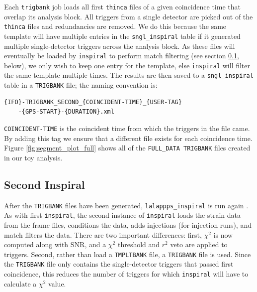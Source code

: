 Each \texttt{trigbank} job loads all first \texttt{thinca} files of a given
coincidence time that overlap its analysis block. All triggers from a single
detector are picked out of the \texttt{thinca} files and redundancies are
removed. We do this because the same template will have multiple entries in the
\texttt{sngl\_inspiral} table if it generated multiple single-detector triggers
across the analysis block. As these files will eventually be loaded by
\texttt{inspiral} to perform match filtering (see section
\ref{sec:second_inspiral}, below), we only wish to keep one entry for the
template, else \texttt{inspiral} will filter the same template multiple times.
The results are then saved to a \texttt{sngl\_inspiral} table in a
\texttt{TRIGBANK} file; the naming convention is:
\begin{verbatim}
{IFO}-TRIGBANK_SECOND_{COINCIDENT-TIME}_{USER-TAG}
    -{GPS-START}-{DURATION}.xml
\end{verbatim}
\texttt{COINCIDENT-TIME} is the coincident time from which the triggers in the file
came. By adding this tag we ensure that a different file exists for each
coincidence time. Figure \ref{fig:segment_plot_full} shows all of the
\texttt{FULL\_DATA TRIGBANK} files created in our toy analysis.

\subsection{Second Inspiral}
\label{sec:second_inspiral}

After the \verb|TRIGBANK| files have been generated, \texttt{lalappps\_inspiral} is
run again \cite{brown-2005-22}. As with first \texttt{inspiral}, the second
instance of \texttt{inspiral} loads the strain data from the frame files,
conditions the data, adds injections (for injection runs), and match filters
the data. There are two important differences: first, $\chi^2$ is now computed
along with \ac{SNR}, and a $\chi^2$ threshold and $r^2$ veto are applied to
triggers.  Second, rather than load a \texttt{TMPLTBANK} file, a
\texttt{TRIGBANK} file is used. Since the \texttt{TRIGBANK} file only contains
the single-detector triggers that passed first coincidence, this reduces the
number of triggers for which \texttt{inspiral} will have to calculate a
$\chi^2$ value.

